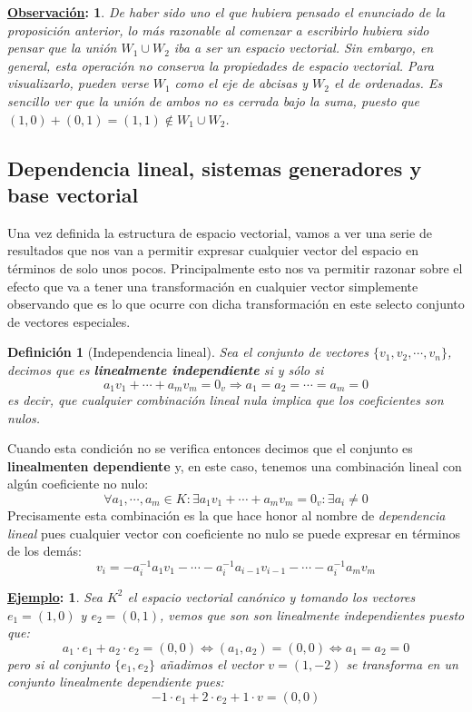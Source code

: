 \documentclass[10pt,a4paper,openright]{book}
\theoremstyle{break}
\newtheorem*{defi}{Definición}
\newtheorem*{obs}{\underline{Observación}:}
\newtheorem*{ej}{\underline{Ejemplo}:}
\begin{document}
\begin{obs}
De haber sido uno el que hubiera pensado el enunciado de la proposición anterior, lo más razonable al comenzar a escribirlo hubiera sido pensar que la unión $W_1 \cup W_2$ iba a ser un espacio vectorial. Sin embargo, en general, esta operación no conserva la propiedades de espacio vectorial. Para visualizarlo, pueden verse $W_1$ como el eje de abcisas y $W_2$ el de ordenadas. Es sencillo ver que la unión de ambos no es cerrada bajo la suma, puesto que $(1,0) + (0,1) = (1,1)\notin W_1 \cup W_2$.
\end{obs}


\subsection{Dependencia lineal, sistemas generadores y base vectorial}
Una vez definida la estructura de espacio vectorial, vamos a ver una serie de resultados que nos van a permitir expresar cualquier vector del espacio en términos de solo unos pocos. Principalmente esto nos va permitir razonar sobre el efecto que va a tener una transformación en cualquier vector simplemente observando que es lo que ocurre con dicha transformación en este selecto conjunto de vectores especiales.

\begin{defi}[Independencia lineal]
Sea el conjunto de vectores $\{v_1, v_2, \cdots, v_n\}$, decimos que es \textbf{linealmente independiente} si y sólo si
$$
a_1v_1+\cdots +a_mv_m=0_v\Rightarrow a_1=a_2=\cdots =a_m=0
$$
es decir, que cualquier combinación lineal nula implica que los coeficientes son nulos.
\end{defi}

Cuando esta condición no se verifica entonces decimos que el conjunto es \textbf{linealmenten dependiente} y, en este caso, tenemos una combinación lineal con algún coeficiente no nulo:
$$
\forall a_1, \cdots, a_m\in K: \exists a_1v_1+\cdots +a_mv_m=0_v: \exists a_i\neq 0
$$
Precisamente esta combinación es la que hace honor al nombre de \textit{dependencia lineal} pues cualquier vector con coeficiente no nulo se puede expresar en términos de los demás:
$$
v_i=-a_i^{-1}a_1v_1-\cdots-a_i^{-1}a_{i-1}v_{i-1}-\cdots-a_i^{-1}a_mv_m
$$

\begin{ej}
Sea $K^2$ el espacio vectorial canónico y tomando los vectores $e_1=(1,0)$ y $e_2=(0,1)$, vemos que son son linealmente independientes puesto que:
$$
a_1\cdot e_1+a_2\cdot e_2=(0,0)\Leftrightarrow (a_1,a_2)=(0,0)\Leftrightarrow a_1=a_2=0
$$
pero si al conjunto $\{e_1, e_2\}$ añadimos el vector $v=(1,-2)$ se transforma en un conjunto linealmente dependiente pues:
$$
-1\cdot e_1+ 2\cdot e_2+ 1\cdot v=(0,0)
$$
\end{ej}
\end{document}
